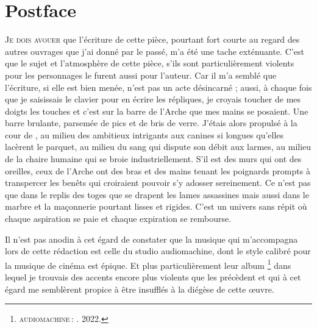 

\chapter{Postface}

\lettrine[lines=3]{J}{e dois avouer} que l’écriture de cette pièce, pourtant fort courte au regard des autres ouvrages que j’ai donné par le passé, m’a été une tache exténuante. C’est que le sujet et l’atmosphère de cette pièce, s’ils sont particulièrement violents pour les personnages le furent aussi pour l’auteur. Car il m’a semblé que l’écriture, si elle est bien menée, n’est pas un acte désincarné ; aussi, à chaque fois que je saisissais le clavier pour en écrire les répliques, je croyais toucher de mes doigts les touches et c’est sur la barre de l’Arche que mes mains se posaient. Une barre brulante, parsemée de pics et de bris de verre. J’étais alors propulsé à la cour de \campprincipal, au milieu des ambitieux intrigants aux canines si longues qu’elles lacèrent le parquet, au milieu du sang qui dispute son débit aux larmes, au milieu de la chaire humaine qui se broie industriellement. S’il est des murs qui ont des oreilles, ceux de l’Arche ont des bras et des mains tenant les poignards prompts à transpercer les benêts qui croiraient pouvoir s’y adosser sereinement. Ce n’est pas que dans le replis des toges que se drapent les lames assassines mais aussi dans le marbre et la maçonnerie pourtant lisses et rigides. C’est un univers sans répit où chaque aspiration se paie et chaque expiration se rembourse.

Il n’est pas anodin à cet égard de constater que la musique qui m’accompagna lors de cette rédaction est celle du studio audiomachine, dont le style calibré pour la musique de cinéma est épique. Et plus particulièrement leur album \footnote{\textsc{audiomachine} : . 2022.} dans lequel je trouvais des accents encore plus violents que les précèdent et qui à cet égard me semblèrent propice à être insufflés à la diégèse de cette œuvre.

